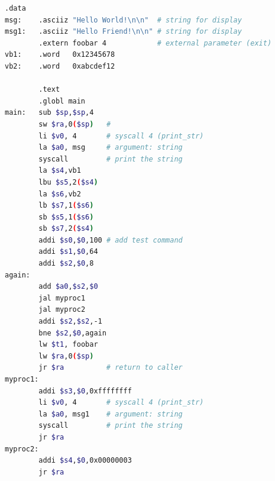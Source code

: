 \documentclass[11pt]{SEU-Digital-Report}
\begin{document}
      \begin{lstlisting}[language=sh,tabsize=4,morekeywords={
        j,la,li,syscall,move,sll,sub,bge,sll,add,sw,addi,jal,ls,subu,jr,lw,bgt,bne,lbu,lb,sb
      },title={HelloWorld3.s}]
        .data
msg:    .asciiz "Hello World!\n\n"  # string for display
msg1:   .asciiz "Hello Friend!\n\n" # string for display
        .extern foobar 4            # external parameter (exit)
vb1:    .word   0x12345678
vb2:    .word   0xabcdef12

        .text
        .globl main
main:   sub $sp,$sp,4
        sw $ra,0($sp)   #
        li $v0, 4       # syscall 4 (print_str)
        la $a0, msg     # argument: string
        syscall         # print the string
        la $s4,vb1
        lbu $s5,2($s4)
        la $s6,vb2
        lb $s7,1($s6)
        sb $s5,1($s6)
        sb $s7,2($s4)
        addi $s0,$0,100 # add test command
        addi $s1,$0,64
        addi $s2,$0,8
again:
        add $a0,$s2,$0
        jal myproc1
        jal myproc2
        addi $s2,$s2,-1
        bne $s2,$0,again
        lw $t1, foobar
        lw $ra,0($sp)
        jr $ra          # return to caller
myproc1:
        addi $s3,$0,0xffffffff
        li $v0, 4       # syscall 4 (print_str)
        la $a0, msg1    # argument: string
        syscall         # print the string
        jr $ra
myproc2:
        addi $s4,$0,0x00000003
        jr $ra
        

      \end{lstlisting}
\end{document}
